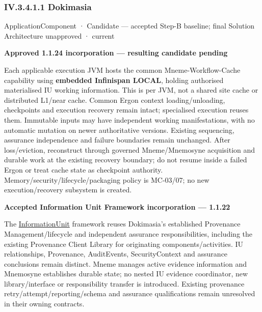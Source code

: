 \subsubsection*{IV.3.4.1.1 Dokimasia}
\label{navigation:IV.3.4.1.1}

\label{element:d739c75dffe2453081735710b285f03b}
{\small ApplicationComponent · Candidate — accepted Step-B baseline; final Solution Architecture unapproved · current}\par

\par\medskip\textbf{Approved 1.1.24 incorporation — resulting candidate pending}\par


Each applicable execution JVM hosts the common Mneme-Workflow-Cache capability using \textbf{embedded Infinispan LOCAL}, holding authorised materialised IU working information. This is per JVM, not a shared site cache or distributed L1/near cache. Common Ergon context loading/unloading, checkpoints and execution recovery remain intact; specialised execution reuses them. Immutable inputs may have independent working manifestations, with no automatic mutation on newer authoritative versions. Existing sequencing, assurance independence and failure boundaries remain unchanged. After loss/eviction, reconstruct through governed Mneme/Mnemosyne acquisition and durable work at the existing recovery boundary; do not resume inside a failed Ergon or treat cache state as checkpoint authority. Memory/security/lifecycle/packaging policy is MC-03/07; no new execution/recovery subsystem is created.



\par\medskip\textbf{Accepted Information Unit Framework incorporation — 1.1.22}\par


The \hyperref[element:74ec609de1ae498fbf9d13e4ef8c6cbe]{InformationUnit} framework reuses Dokimasia's established Provenance Management/lifecycle and independent assurance responsibilities, including the existing Provenance Client Library for originating components/activities. IU relationships, Provenance, AuditEvents, SecurityContext and assurance conclusions remain distinct. Mneme manages active evidence information and Mnemosyne establishes durable state; no nested IU evidence coordinator, new library/interface or responsibility transfer is introduced. Existing provenance retry/attempt/reporting/schema and assurance qualifications remain unresolved in their owning contracts.



